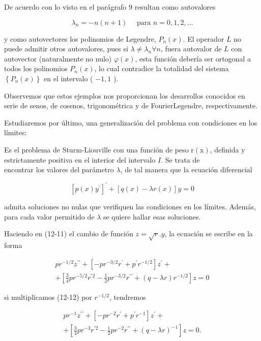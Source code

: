 \documentclass[10pt]{article}
\theoremstyle{plain}
\theoremstyle{definition}
\theoremstyle{remark}
\begin{document}
De acuerdo con lo visto en el parágrafo 9 resultan como autovalores

$$
\lambda_{n}=-n(n+1) \quad \text { para } n=0,1,2, \ldots
$$

y como autovectores los polinomios de Legendre, $P_{n}(x)$. El operador $L$ no puede admitir otros autovalores, pues si $\lambda \neq \lambda_{n} \forall n$, fuera autovalor de $L$ con autovector (naturalmente no nulo) $\varphi(x)$, esta función debería ser ortogonal a todos los polinomios $P_{n}(x)$, lo cual contradice la totalidad del sistema $\left\{P_{n}(x)\right\}$ en el intervalo ( $-1,1$ ).

Observemos que estos ejemplos nos proporcionan los desarrollos conocidos en serie de senos, de cosenos, trigonométrica y de FourierLegendre, respectivamente.

Estudiaremos por último, una generalización del problema con condiciones en los límites:

Es el problema de Sturm-Liouville con una función de peso $\mathrm{r}(\mathrm{x})$, definida y estrictamente positiva en el interior del intervalo $I$. Se trata de\\
encontrar los valores del parámetro $\lambda$, de tal manera que la ecuación diferencial


\begin{equation*}
\left[p(x) y^{\prime}\right]^{\prime}+[q(x)-\lambda r(x)] y=0 \tag{12-11}
\end{equation*}


admita soluciones no nulas que verifiquen las condiciones en los límites. Además, para cada valor permitido de $\lambda$ se quiere hallar esas soluciones.

Haciendo en (12-11) el cambio de función $z=\sqrt{r} . y$, la ecuación se escribe en la forma


\begin{gather*}
p r^{-1 / 2} z^{\prime \prime}+\left[-p r^{-3 / 2} r^{\prime}+p^{\prime} r^{-1 / 2}\right] z^{\prime}+ \\
+\left[\frac{3}{4} p r^{-5 / 2} r^{\prime 2}-\frac{1}{2} p r^{-3 / 2} r^{\prime \prime}+(q-\lambda r) r^{-1 / 2}\right] z=0 \tag{12-12}
\end{gather*}


si multiplicamos (12-12) por $r^{-1 / 2}$, tendremos


\begin{gather*}
p r^{-1} z^{\prime \prime}+\left[-p r^{-2} r^{\prime}+p^{\prime} r^{-1}\right] z^{\prime}+ \\
+\left[\frac{3}{4} p r^{-3} r^{\prime 2}-\frac{1}{2} p r^{-2} r^{\prime \prime}+(q-\lambda r)^{-1}\right] z=0 . \tag{12-13}
\end{gather*}
\end{document}
